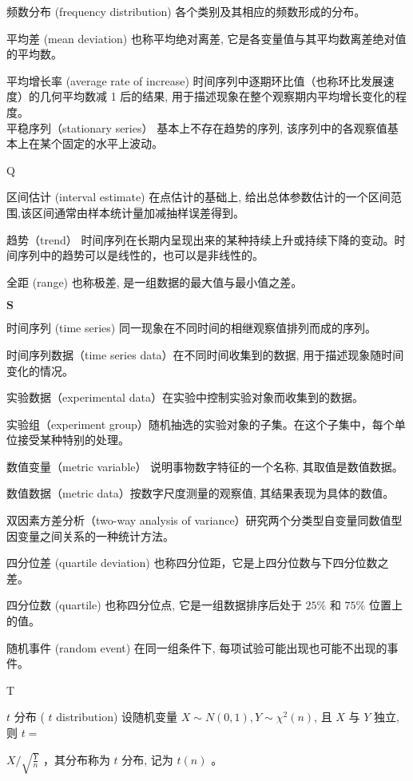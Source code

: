 \documentclass[10pt]{article}
\begin{document}
\begin{CJK*}{UTF8}{bsmi}
频数分布 (frequency distribution) 各个类别及其相应的频数形成的分布。

平均差 (mean deviation) 也称平均绝对离差, 它是各变量值与其平均数离差绝对值的平均数。

平均增长率 (average rate of increase) 时间序列中逐期环比值（也称环比发展速度）的几何平均数减 1 后的结果, 用于描述现象在整个观察期内平均增长变化的程度。\\
平稳序列（stationary series） 基本上不存在趋势的序列, 该序列中的各观察值基本上在某个固定的水平上波动。

Q

区间估计 (interval estimate) 在点估计的基础上, 给出总体参数估计的一个区间范围,该区间通常由样本统计量加减抽样误差得到。

趋势（trend） 时间序列在长期内呈现出来的某种持续上升或持续下降的变动。时间序列中的趋势可以是线性的，也可以是非线性的。

全距 (range) 也称极差, 是一组数据的最大值与最小值之差。

$\mathbf{S}$

时间序列 (time series) 同一现象在不同时间的相继观察值排列而成的序列。

时间序列数据（time series data）在不同时间收集到的数据, 用于描述现象随时间变化的情况。

实验数据（experimental data）在实验中控制实验对象而收集到的数据。

实验组（experiment group）随机抽选的实验对象的子集。在这个子集中，每个单位接受某种特别的处理。

数值变量（metric variable） 说明事物数字特征的一个名称, 其取值是数值数据。

数值数据（metric data）按数字尺度测量的观察值, 其结果表现为具体的数值。

双因素方差分析（two-way analysis of variance）研究两个分类型自变量同数值型因变量之间关系的一种统计方法。

四分位差 (quartile deviation) 也称四分位距，它是上四分位数与下四分位数之差。

四分位数 (quartile) 也称四分位点, 它是一组数据排序后处于 $25 \%$ 和 $75 \%$ 位置上的值。

随机事件 (random event) 在同一组条件下, 每项试验可能出现也可能不出现的事件。

T

$t$ 分布 ( $t$ distribution) 设随机变量 $X \sim N(0,1), Y \sim \chi^{2}(n)$, 且 $X$ 与 $Y$ 独立, 则 $t=$

$X / \sqrt{\frac{Y}{n}}$ ，其分布称为 $t$ 分布, 记为 $t(n)$ 。


\end{CJK*}
\end{document}
